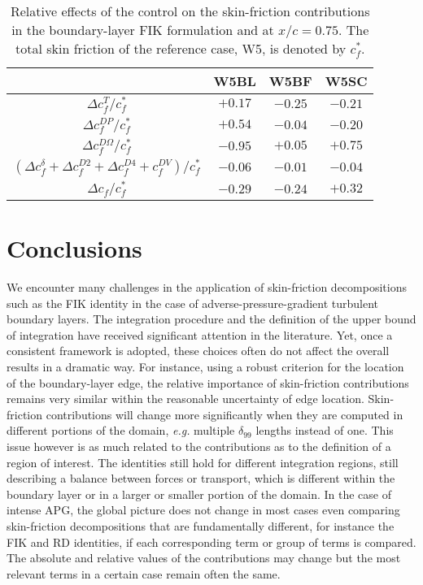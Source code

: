 \begin{table}
\caption{\label{tab:FIKcontrol2}Relative effects of the control on the skin-friction contributions in the boundary-layer FIK formulation and at $x/c=0.75$. The total skin friction of the reference case, W5, is denoted by $c_f^*$.}
\centering
\begin{tabular}{cccc}
\hline \hline
 &W5BL& W5BF & W5SC\\  \hline
$\Delta c^T_f/c_f^*$ & $+0.17$ & $\bm{-0.25}$ & $-0.21$ \\   \hline
$\Delta c^{DP}_f/c_f^*$ & $+0.54$ & $-0.04$ & $-0.20$ \\
$\Delta c^{D\Omega}_f/c_f^*$ & $\bm{-0.95}$ & $+0.05$ & $\bm{+0.75}$ \\  \hline
$(\Delta c^{\delta}_f+\Delta c^{D2}_f+\Delta c^{D4}_f + c^{DV}_f)/c_f^*$ & $-0.06$ & $-0.01$ & $-0.04$ \\  \hline
$\Delta c_f/c_f^{*}$ & $-0.29$ & $-0.24$ & $+0.32$ \\
\hline \hline
\end{tabular}
 
\end{table}


\section{Conclusions}

We encounter many challenges in the application of skin-friction decompositions such as the FIK identity in the case of adverse-pressure-gradient turbulent boundary layers. The integration procedure and the definition of the upper bound of integration have received significant attention in the literature. Yet, once a consistent framework is adopted, these choices often do not affect the overall results in a dramatic way. For instance, using a robust criterion for the location of the boundary-layer edge, the relative importance of skin-friction contributions remains very similar within the reasonable uncertainty of edge location. Skin-friction contributions will change more significantly when they are computed in different portions of the domain, \textit{e.g.} multiple $\delta_{99}$ lengths instead of one. This issue however is as much related to the contributions as to the definition of a region of interest. The identities still hold for different integration regions, still describing a balance between forces or transport, which is different within the boundary layer or in a larger or smaller portion of the domain. In the case of intense APG, the global picture does not change in most cases even comparing skin-friction decompositions that are fundamentally different, for instance the FIK and RD identities, if each corresponding term or group of terms is compared. The absolute and relative values of the contributions may change but the most relevant terms in a certain case remain often the same. 

